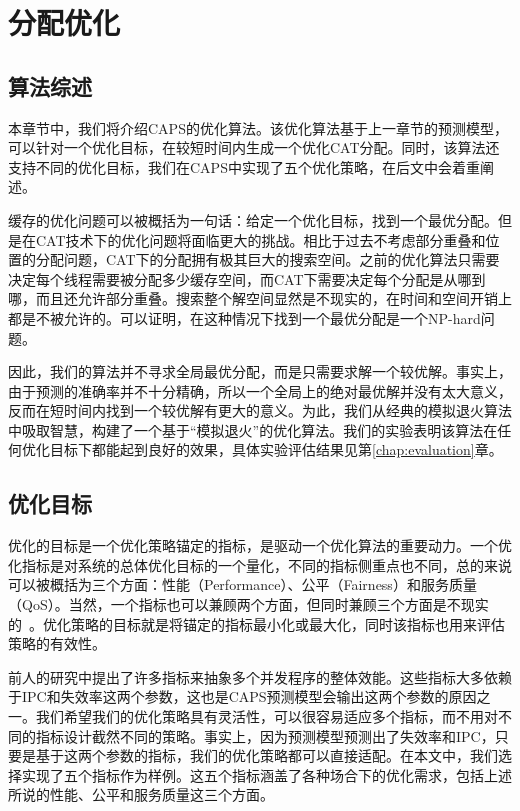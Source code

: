 
\chapter{分配优化} \label{chap:allocation}

\section{算法综述}

本章节中，我们将介绍CAPS的优化算法。该优化算法基于上一章节的预测模型，可以针对一个优化目标，在较短时间内生成一个优化CAT分配。同时，该算法还支持不同的优化目标，我们在CAPS中实现了五个优化策略，在后文中会着重阐述。

缓存的优化问题可以被概括为一句话：给定一个优化目标，找到一个最优分配。但是在CAT技术下的优化问题将面临更大的挑战。相比于过去不考虑部分重叠和位置的分配问题，CAT下的分配拥有极其巨大的搜索空间。之前的优化算法只需要决定每个线程需要被分配多少缓存空间，而CAT下需要决定每个分配是从哪到哪，而且还允许部分重叠。搜索整个解空间显然是不现实的，在时间和空间开销上都是不被允许的。可以证明，在这种情况下找到一个最优分配是一个NP-hard问题。

因此，我们的算法并不寻求全局最优分配，而是只需要求解一个较优解。事实上，由于预测的准确率并不十分精确，所以一个全局上的绝对最优解并没有太大意义，反而在短时间内找到一个较优解有更大的意义。为此，我们从经典的模拟退火算法中吸取智慧，构建了一个基于“模拟退火”的优化算法。我们的实验表明该算法在任何优化目标下都能起到良好的效果，具体实验评估结果见第\ref{chap:evaluation}章。

\section{优化目标} \label{sec:opt_goals}

优化的目标是一个优化策略锚定的指标，是驱动一个优化算法的重要动力。一个优化指标是对系统的总体优化目标的一个量化，不同的指标侧重点也不同，总的来说可以被概括为三个方面：性能（Performance）、公平（Fairness）和服务质量（QoS）。当然，一个指标也可以兼顾两个方面，但同时兼顾三个方面是不现实的~\parencite{hsu2006communist}。优化策略的目标就是将锚定的指标最小化或最大化，同时该指标也用来评估策略的有效性。

前人的研究中提出了许多指标来抽象多个并发程序的整体效能。这些指标大多依赖于IPC和失效率这两个参数，这也是CAPS预测模型会输出这两个参数的原因之一。我们希望我们的优化策略具有灵活性，可以很容易适应多个指标，而不用对不同的指标设计截然不同的策略。事实上，因为预测模型预测出了失效率和IPC，只要是基于这两个参数的指标，我们的优化策略都可以直接适配。在本文中，我们选择实现了五个指标作为样例。这五个指标涵盖了各种场合下的优化需求，包括上述所说的性能、公平和服务质量这三个方面。

